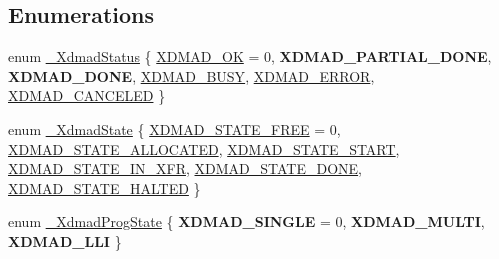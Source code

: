 \subsection*{Enumerations}
\begin{DoxyCompactItemize}
\item 
enum \mbox{\hyperlink{group__dmad__structs_gaec02ce64b667fbde91b1a90f4c61e3ca}{\+\_\+\+Xdmad\+Status}} \{ \newline
\mbox{\hyperlink{group__dmad__structs_ggaec02ce64b667fbde91b1a90f4c61e3caab219af3a1da995b8450046cfadffc385}{X\+D\+M\+A\+D\+\_\+\+OK}} = 0, 
{\bfseries X\+D\+M\+A\+D\+\_\+\+P\+A\+R\+T\+I\+A\+L\+\_\+\+D\+O\+NE}, 
{\bfseries X\+D\+M\+A\+D\+\_\+\+D\+O\+NE}, 
\mbox{\hyperlink{group__dmad__structs_ggaec02ce64b667fbde91b1a90f4c61e3caa2f1dedf09032fbf9e5b32a6cb6dcfbc7}{X\+D\+M\+A\+D\+\_\+\+B\+U\+SY}}, 
\newline
\mbox{\hyperlink{group__dmad__structs_ggaec02ce64b667fbde91b1a90f4c61e3caa77109a75556348326c7c93948a8e7de0}{X\+D\+M\+A\+D\+\_\+\+E\+R\+R\+OR}}, 
\mbox{\hyperlink{group__dmad__structs_ggaec02ce64b667fbde91b1a90f4c61e3caa2cbfa0eaf462985eaae7d2e34cec2b92}{X\+D\+M\+A\+D\+\_\+\+C\+A\+N\+C\+E\+L\+ED}}
 \}
\item 
enum \mbox{\hyperlink{group__dmad__structs_gab11875bdf8f31a2c76972640dcf13d89}{\+\_\+\+Xdmad\+State}} \{ \newline
\mbox{\hyperlink{group__dmad__structs_ggab11875bdf8f31a2c76972640dcf13d89a9cd05b332712afcc8df5254d341f7d34}{X\+D\+M\+A\+D\+\_\+\+S\+T\+A\+T\+E\+\_\+\+F\+R\+EE}} = 0, 
\mbox{\hyperlink{group__dmad__structs_ggab11875bdf8f31a2c76972640dcf13d89ad505e5568a1e0d58569dd4fd203ec920}{X\+D\+M\+A\+D\+\_\+\+S\+T\+A\+T\+E\+\_\+\+A\+L\+L\+O\+C\+A\+T\+ED}}, 
\mbox{\hyperlink{group__dmad__structs_ggab11875bdf8f31a2c76972640dcf13d89aee36943f32e5ecabc55325a8679f6d5e}{X\+D\+M\+A\+D\+\_\+\+S\+T\+A\+T\+E\+\_\+\+S\+T\+A\+RT}}, 
\mbox{\hyperlink{group__dmad__structs_ggab11875bdf8f31a2c76972640dcf13d89a7657925f57abc3706b08d5d83e9a5702}{X\+D\+M\+A\+D\+\_\+\+S\+T\+A\+T\+E\+\_\+\+I\+N\+\_\+\+X\+FR}}, 
\newline
\mbox{\hyperlink{group__dmad__structs_ggab11875bdf8f31a2c76972640dcf13d89ad9b930bf4ecc19f7a3a2f1547f2084a1}{X\+D\+M\+A\+D\+\_\+\+S\+T\+A\+T\+E\+\_\+\+D\+O\+NE}}, 
\mbox{\hyperlink{group__dmad__structs_ggab11875bdf8f31a2c76972640dcf13d89a2ba810d41b65ede7d5668a4b8639f749}{X\+D\+M\+A\+D\+\_\+\+S\+T\+A\+T\+E\+\_\+\+H\+A\+L\+T\+ED}}
 \}
\item 
enum \mbox{\hyperlink{group__dmad__structs_gaea9ca6ac14cc448af9be1515bd2205c5}{\+\_\+\+Xdmad\+Prog\+State}} \{ {\bfseries X\+D\+M\+A\+D\+\_\+\+S\+I\+N\+G\+LE} = 0, 
{\bfseries X\+D\+M\+A\+D\+\_\+\+M\+U\+L\+TI}, 
{\bfseries X\+D\+M\+A\+D\+\_\+\+L\+LI}
 \}
\end{DoxyCompactItemize}


